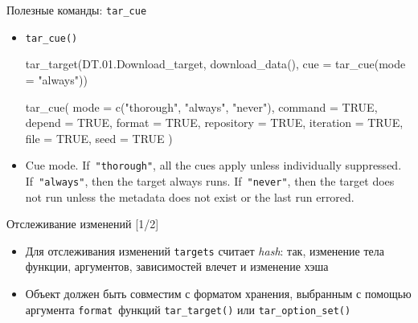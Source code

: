 \documentclass[
  ignorenonframetext,
]{beamer}
\newenvironment{Shaded}{\begin{snugshade}}{\end{snugshade}}
\newcommand{\AttributeTok}[1]{\textcolor[rgb]{0.40,0.45,0.13}{#1}}
\newcommand{\ConstantTok}[1]{\textcolor[rgb]{0.56,0.35,0.01}{#1}}
\newcommand{\FloatTok}[1]{\textcolor[rgb]{0.68,0.00,0.00}{#1}}
\newcommand{\FunctionTok}[1]{\textcolor[rgb]{0.28,0.35,0.67}{#1}}
\newcommand{\NormalTok}[1]{\textcolor[rgb]{0.00,0.23,0.31}{#1}}
\newcommand{\StringTok}[1]{\textcolor[rgb]{0.13,0.47,0.30}{#1}}
\begin{document}
\begin{frame}[fragile]{Полезные команды: \texttt{tar\_cue}}
\label{ux43fux43eux43bux435ux437ux43dux44bux435-ux43aux43eux43cux430ux43dux434ux44b-tar_cue}
\begin{itemize}
\item
  \texttt{tar\_cue()}

\begin{Shaded}
\begin{Highlighting}[]
\FunctionTok{tar\_target}\NormalTok{(DT.}\FloatTok{01.}\NormalTok{Download\_target, }\FunctionTok{download\_data}\NormalTok{(), }\AttributeTok{cue =} \FunctionTok{tar\_cue}\NormalTok{(}\AttributeTok{mode =} \StringTok{"always"}\NormalTok{))}
\end{Highlighting}
\end{Shaded}

\begin{Shaded}
\begin{Highlighting}[]
\FunctionTok{tar\_cue}\NormalTok{(}
  \AttributeTok{mode =} \FunctionTok{c}\NormalTok{(}\StringTok{"thorough"}\NormalTok{, }\StringTok{"always"}\NormalTok{, }\StringTok{"never"}\NormalTok{),}
  \AttributeTok{command =} \ConstantTok{TRUE}\NormalTok{,}
  \AttributeTok{depend =} \ConstantTok{TRUE}\NormalTok{,}
  \AttributeTok{format =} \ConstantTok{TRUE}\NormalTok{,}
  \AttributeTok{repository =} \ConstantTok{TRUE}\NormalTok{,}
  \AttributeTok{iteration =} \ConstantTok{TRUE}\NormalTok{,}
  \AttributeTok{file =} \ConstantTok{TRUE}\NormalTok{,}
  \AttributeTok{seed =} \ConstantTok{TRUE}
\NormalTok{)}
\end{Highlighting}
\end{Shaded}
\item
  Cue mode. If~\texttt{"thorough"}, all the cues apply unless
  individually suppressed. If~\texttt{"always"}, then the target always
  runs. If~\texttt{"never"}, then the target does not run unless the
  metadata does not exist or the last run errored.
\end{itemize}
\end{frame}

\begin{frame}[fragile]{Отслеживание изменений {[}1/2{]}}
\label{ux43eux442ux441ux43bux435ux436ux438ux432ux430ux43dux438ux435-ux438ux437ux43cux435ux43dux435ux43dux438ux439-12}
\begin{itemize}
\item
  Для отслеживания изменений \texttt{targets} считает \emph{hash}: так,
  изменение тела функции, аргументов, зависимостей влечет и изменение
  хэша
\item
  Объект должен быть совместим с форматом хранения, выбранным с помощью
  аргумента \texttt{format}~функций \texttt{tar\_target()} или
  \texttt{tar\_option\_set()}
\end{itemize}
\end{frame}
\end{document}
